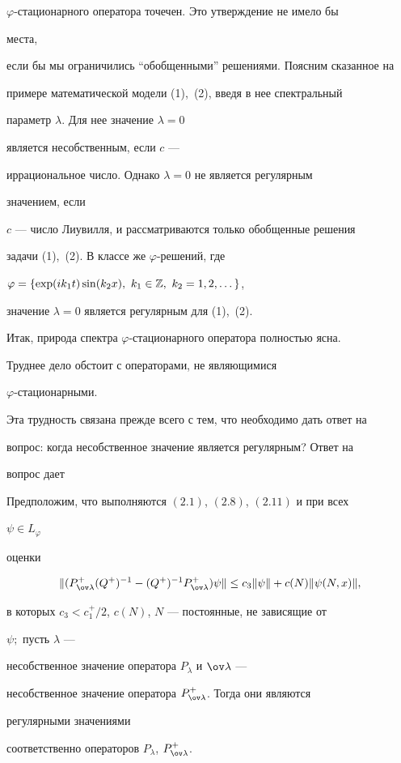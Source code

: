 $\varphi$-стационарного оператора точечен. Это утверждение не имело бы 


места, 


если бы мы ограничились ``обобщенными'' решениями. Поясним сказанное на 


примере математической модели (1),~(2), введя в нее спектральный 


параметр $\lambda$. Для нее значение $\lambda=0$ 


является несобственным, если $c$ --- 


иррациональное число. Однако $\lambda=0$ не является регулярным 


значением, если 


$c$ --- число Лиувилля, и рассматриваются только обобщенные решения 


задачи (1),~(2). В классе же $\varphi$-решений, где 


$\varphi=\{\exp(ik_1t)\sin(k_2x),\ k_1\in\Bbb Z,\ k_2=1,2,\dotsc\}$, 


значение $\lambda=0$ является регулярным для (1),~(2). 


 


Итак, природа спектра $\varphi$-стационарного оператора полностью ясна. 


Труднее дело обстоит с операторами, не являющимися 


$\varphi$-стационарными. 


Эта трудность связана прежде всего с тем, что необходимо дать ответ на 


вопрос: когда несобственное значение является регулярным? Ответ на 


вопрос дает


 


\begin{thms} 


Предположим, что выполняются $(2.1)$, $(2.8)$, $(2.11)$ и при всех 


$\psi\in L_\varphi$ 


оценки 


\begin{equation} 


\|(P^+_{\ov\lambda}(Q^+)^{-1}-(Q^+)^{-1}P^+_{\ov\lambda})\psi\|\le 


c_3\|\psi\|+c(N)\|\psi(N,x)\|, 


\end{equation} 


в которых $c_3<c^+_1/2$, $c(N)$, $N$ --- постоянные, не зависящие от 


$\psi;$ пусть $\lambda$ --- 


несобственное значение оператора $P_\lambda$ и $\ov\lambda$ --- 


несобственное значение оператора $P^+_{\ov\lambda}$. Тогда они являются 


регулярными значениями 


соответственно операторов $P_\lambda$, $P^+_{\ov\lambda}$. 


\end{thms} 


